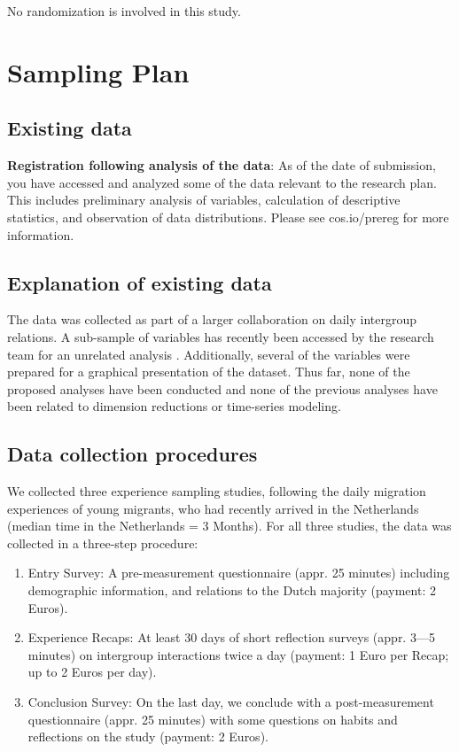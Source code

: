 \documentclass[]{article}
\providecommand{\tightlist}{%
\setlength{\itemsep}{0pt}\setlength{\parskip}{0pt}}
\newcounter{question}
\begin{document}
No randomization is involved in this study.

\hypertarget{sampling-plan}{%
\section{Sampling Plan}\label{sampling-plan}}

\hypertarget{existing-data}{%
\subsection{Existing data}\label{existing-data}}

\textbf{Registration following analysis of the data}: As of the date of
submission, you have accessed and analyzed some of the data relevant to
the research plan. This includes preliminary analysis of variables,
calculation of descriptive statistics, and observation of data
distributions. Please see cos.io/prereg for more information.

\hypertarget{explanation-of-existing-data}{%
\subsection{Explanation of existing
data}\label{explanation-of-existing-data}}

The data was collected as part of a larger collaboration on daily
intergroup relations. A sub-sample of variables has recently been
accessed by the research team for an unrelated analysis
\citep{Kreienkamp2022b}. Additionally, several of the variables were
prepared for a graphical presentation of the dataset. Thus far, none of
the proposed analyses have been conducted and none of the previous
analyses have been related to dimension reductions or time-series
modeling.

\hypertarget{data-collection-procedures}{%
\subsection{Data collection
procedures}\label{data-collection-procedures}}

We collected three experience sampling studies, following the daily
migration experiences of young migrants, who had recently arrived in the
Netherlands (median time in the Netherlands = 3 Months). For all three
studies, the data was collected in a three-step procedure:

\begin{enumerate}
\def\labelenumi{\arabic{enumi}.}
\tightlist
\item
  Entry Survey: A pre-measurement questionnaire (appr. 25 minutes)
  including demographic information, and relations to the Dutch majority
  (payment: 2 Euros).
\item
  Experience Recaps: At least 30 days of short reflection surveys (appr.
  3---5 minutes) on intergroup interactions twice a day (payment: 1 Euro
  per Recap; up to 2 Euros per day).
\item
  Conclusion Survey: On the last day, we conclude with a
  post-measurement questionnaire (appr. 25 minutes) with some questions
  on habits and reflections on the study (payment: 2 Euros).
\end{enumerate}
\end{document}
